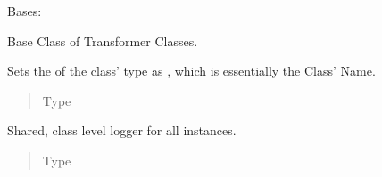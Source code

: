 \documentclass[a4paper,10pt, twoside,english]{sphinxmanual}
\begin{document}
\begin{fulllineitems}
\label{\detokenize{base_classes/transformer:spooq2.transformer.transformer.Transformer}}
Bases: 

Base Class of Transformer Classes.

\begin{fulllineitems}
\label{\detokenize{base_classes/transformer:spooq2.transformer.transformer.Transformer.name}}
Sets the  of the class’ type as , which is essentially the Class’ Name.
\begin{quote}\begin{description}
\item[{Type}] \leavevmode
{}

\end{description}\end{quote}

\end{fulllineitems}


\begin{fulllineitems}
\label{\detokenize{base_classes/transformer:spooq2.transformer.transformer.Transformer.logger}}
Shared, class level logger for all instances.
\begin{quote}\begin{description}
\item[{Type}] \leavevmode
{}

\end{description}\end{quote}

\end{fulllineitems}



\end{fulllineitems}
\end{document}
